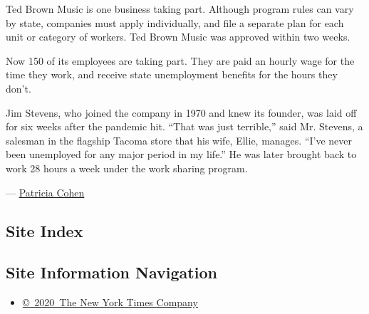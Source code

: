 Ted Brown Music is one business taking part. Although program rules can
vary by state, companies must apply individually, and file a separate
plan for each unit or category of workers. Ted Brown Music was approved
within two weeks.

Now 150 of its employees are taking part. They are paid an hourly wage
for the time they work, and receive state unemployment benefits for the
hours they don't.

Jim Stevens, who joined the company in 1970 and knew its founder, was
laid off for six weeks after the pandemic hit. ``That was just
terrible,'' said Mr. Stevens, a salesman in the flagship Tacoma store
that his wife, Ellie, manages. ``I've never been unemployed for any
major period in my life.'' He was later brought back to work 28 hours a
week under the work sharing program.

--- \href{https://www.nytimes3xbfgragh.onion/by/patricia-cohen}{Patricia
Cohen}

\hypertarget{site-index}{%
\subsection{Site Index}\label{site-index}}

\hypertarget{site-information-navigation}{%
\subsection{Site Information
Navigation}\label{site-information-navigation}}

\begin{itemize}
\tightlist
\item
  \href{https://help.nytimes3xbfgragh.onion/hc/en-us/articles/115014792127-Copyright-notice}{©~2020~The
  New York Times Company}
\end{itemize}

